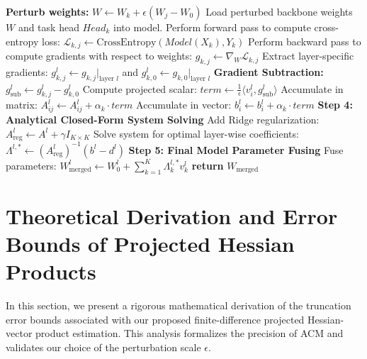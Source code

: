 \begin{algorithm}[htbp]
\begin{small}
\begin{algorithmic}[1]
        \ENDFOR
    \ENDFOR
    \STATE
        \STATE \textbf{Perturb weights:} $W \leftarrow W_k + \epsilon (W_j - W_0)$
        \STATE Load perturbed backbone weights $W$ and task head $Head_k$ into model.
        \STATE Perform forward pass to compute cross-entropy loss: $\mathcal{L}_{k,j} \leftarrow \text{CrossEntropy}(Model(X_k), Y_k)$
        \STATE Perform backward pass to compute gradients with respect to weights: $g_{k,j} \leftarrow \nabla_W \mathcal{L}_{k,j}$
        \STATE
                \STATE Extract layer-specific gradients: $g_{k,j}^l \leftarrow g_{k,j}|_{\text{layer } l}$ and $g_{k,0}^l \leftarrow g_{k,0}|_{\text{layer } l}$
                \STATE \textbf{Gradient Subtraction:} $g_{\text{sub}}^l \leftarrow g_{k,j}^l - g_{k,0}^l$
                \STATE Compute projected scalar: $term \leftarrow \frac{1}{\epsilon} \langle v_i^l, g_{\text{sub}}^l \rangle$
                \STATE Accumulate in matrix: $A^l_{ij} \leftarrow A^l_{ij} + \alpha_k \cdot term$
                    \STATE Accumulate in vector: $b^l_i \leftarrow b^l_i + \alpha_k \cdot term$
                \ENDIF
            \ENDFOR
        \ENDFOR
    \ENDFOR
\ENDFOR
\STATE
\STATE \textbf{Step 4: Analytical Closed-Form System Solving}
    \STATE Add Ridge regularization: $A^l_{\text{reg}} \leftarrow A^l + \gamma I_{K \times K}$
    \STATE Solve system for optimal layer-wise coefficients: $\Lambda^{l, *} \leftarrow (A^l_{\text{reg}})^{-1} (b^l - d^l)$
\ENDFOR
\STATE
\STATE \textbf{Step 5: Final Model Parameter Fusing}
    \STATE Fuse parameters: $W^l_{\text{merged}} \leftarrow W_0^l + \sum_{k=1}^K \Lambda_k^{l, *} v_k^l$
\ENDFOR
\STATE \textbf{return} $W_{\text{merged}}$
\end{algorithmic}
\end{small}
\end{algorithm}

\newpage
\section{Theoretical Derivation and Error Bounds of Projected Hessian Products}
\label{app:proofs}

In this section, we present a rigorous mathematical derivation of the truncation error bounds associated with our proposed finite-difference projected Hessian-vector product estimation. This analysis formalizes the precision of ACM and validates our choice of the perturbation scale $\epsilon$.


